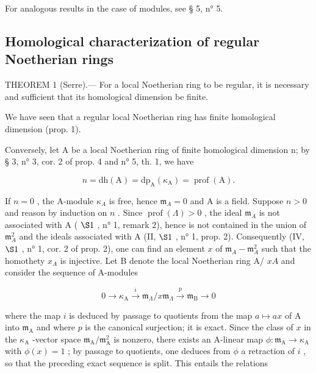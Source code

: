 For analogous results in the case of modules, see § 5, n° 5.

\subsection{Homological characterization of regular Noetherian rings}

THEOREM 1 (Serre).--- For a local Noetherian ring to be regular, it is necessary and sufficient that its homological dimension be finite.

We have seen that a regular local Noetherian ring has finite homological dimension (prop. 1).

Conversely, let A be a local Noetherian ring of finite homological dimension n; by § 3, n° 3, cor. 2 of prop. 4 and n° 5, th. 1, we have

\[
n = \mathrm{dh} (\mathrm{A}) = \mathrm{dp} _ {\mathrm{A}} (\kappa_ {\mathrm{A}}) = \operatorname{prof} (\mathrm{A}).
\]

If \(n=0\) , the A-module \(\kappa_{A}\) is free, hence \(\mathfrak{m}_{A}=0\) and A is a field. Suppose \(n>0\) and reason by induction on \(n\) . Since \(\operatorname{prof}(\Lambda)>0\) , the ideal \(\mathfrak{m}_{A}\) is not associated with A ( \(\S 1\) , n° 1, remark 2), hence is not contained in the union of \(\mathfrak{m}_{A}^{2}\) and the ideals associated with A (II, \(\S 1\) , n° 1, prop. 2). Consequently (IV, \(\S 1\) , n° 1, cor. 2 of prop. 2), one can find an element \(x\) of \(\mathfrak{m}_{A}-\mathfrak{m}_{A}^{2}\) such that the homothety \(x_{A}\) is injective. Let B denote the local Noetherian ring A/ \(xA\) and consider the sequence of A-modules

\[
0 \to \kappa_ {\mathrm{A}} \stackrel {i} {\longrightarrow} \mathfrak {m} _ {\Lambda} / x \mathfrak {m} _ {\Lambda} \stackrel {p} {\longrightarrow} \mathfrak {m} _ {\mathrm{B}} \to 0
\]

where the map \(i\) is deduced by passage to quotients from the map \(a \mapsto ax\) of A into \(\mathfrak{m}_{\mathrm{A}}\) and where \(p\) is the canonical surjection; it is exact. Since the class of \(x\) in the \(\kappa_{\mathrm{A}}\) -vector space \(\mathfrak{m}_{\mathrm{A}} / \mathfrak{m}_{\mathrm{A}}^{2}\) is nonzero, there exists an A-linear map \(\phi : \mathfrak{m}_{\mathrm{A}} \to \kappa_{\mathrm{A}}\) with \(\phi(x) = 1\) ; by passage to quotients, one deduces from \(\phi\) a retraction of \(i\) , so that the preceding exact sequence is split. This entails the relations


